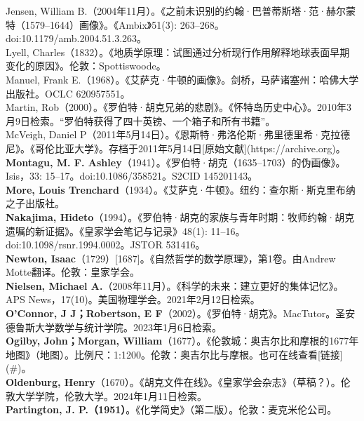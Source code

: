Jensen, William B.（2004年11月）。《之前未识别的约翰·巴普蒂斯塔·范·赫尔蒙特（1579–1644）画像》。《Ambix》51(3): 263–268。doi:10.1179/amb.2004.51.3.263。\\
Lyell, Charles（1832）。《地质学原理：试图通过分析现行作用解释地球表面早期变化的原因》。伦敦：Spottiswoode。\\
Manuel, Frank E.（1968）。《艾萨克·牛顿的画像》。剑桥，马萨诸塞州：哈佛大学出版社。OCLC 620957551。\\
Martin, Rob（2000）。《罗伯特·胡克兄弟的悲剧》。《怀特岛历史中心》。2010年3月9日检索。“罗伯特获得了四十英镑、一个箱子和所有书籍”。\\
McVeigh, Daniel P（2011年5月14日）。《恩斯特·弗洛伦斯·弗里德里希·克拉德尼》。《哥伦比亚大学》。存档于2011年5月14日[原始文献](https://archive.org)。\\
\textbf{Montagu, M. F. Ashley}（1941）。《罗伯特·胡克（1635–1703）的伪画像》。Isis，33: 15–17。doi:10.1086/358521。S2CID 145201143。\\
\textbf{More, Louis Trenchard}（1934）。《艾萨克·牛顿》。纽约：查尔斯·斯克里布纳之子出版社。\\
\textbf{Nakajima, Hideto}（1994）。《罗伯特·胡克的家族与青年时期：牧师约翰·胡克遗嘱的新证据》。《皇家学会笔记与记录》48(1): 11–16。doi:10.1098/rsnr.1994.0002。JSTOR 531416。\\
\textbf{Newton, Isaac}（1729）[1687]。《自然哲学的数学原理》，第1卷。由Andrew Motte翻译。伦敦：皇家学会。\\
\textbf{Nielsen, Michael A.}（2008年11月）。《科学的未来：建立更好的集体记忆》。APS News，17(10)。美国物理学会。2021年2月12日检索。\\
\textbf{O'Connor, J J；Robertson, E F}（2002）。《罗伯特·胡克》。MacTutor。圣安德鲁斯大学数学与统计学院。2023年1月6日检索。\\
\textbf{Ogilby, John；Morgan, William}（1677）。《伦敦城：奥吉尔比和摩根的1677年地图》（地图）。比例尺：1:1200。伦敦：奥吉尔比与摩根。也可在线查看[链接](#)。\\
\textbf{Oldenburg, Henry}（1670）。《胡克文件在线》。《皇家学会杂志》（草稿？）。伦敦大学学院，伦敦大学。2024年1月11日检索。\\
\textbf{Partington, J. P.（1951）}。《化学简史》（第二版）。伦敦：麦克米伦公司。\\